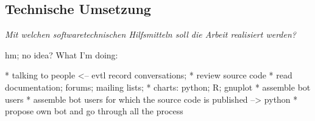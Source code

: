 \documentclass[pdftex,a4paper,11pt]{scrartcl}
\begin{document}
\begin{comment}
\begin{itemize}
	\item Eine wesentliche Grundlage der wissenschaftlichen Arbeit, ist die systematische Anwendung einer Forschungsmethode. Die erlaubt Ihnen ein systematisches Vorgehen bei Ihrer Masterarbeit.
	\item Am HCC.lab werden Arbeiten in den folgenden Bereichen geschrieben:
	       \begin{itemize}
				\item Information Retrieval
				\item Recommender Systeme
				\item Data/Community Analytics <--- me?
				\item Information Visualization
				\item Interaction Design
			\end{itemize}
	\item Sie sollten in der Lage sein, Ihre Arbeit in einen dieser Bereiche einzuordnen. Falls Sie Probleme dabei haben, wenden Sie sich bitte an Ihre/n Betreuer/in.
	\item Für die Auswahl der geeigneten Forschungsmethode verweise ich Sie auf zwei Bücher hin, die eine Zusammenstellung der verfügbaren Methoden und ihre praktischen Anwendung im Bereich Human-Computer Interaction diskutieren \cite{olson2014ways}, \cite{lazar2010research}. Beide Bücher sind bei Frau Prof. Müller-Birn verfügbar. Einzelne Artikel könnten Ihnen auch in einer elektronischen Version zur Verfügung gestellt werden.
\end{itemize}
\end{comment}

\subsection{Technische Umsetzung}
\noindent \emph{Mit welchen softwaretechnischen Hilfsmitteln soll die Arbeit realisiert werden?}
\begin{comment}
\begin{itemize}
	\item Selbstverständlich können Sie an der Stelle noch nicht alles wissen, aber Sie sollen sich hier bereits einen guten Überblick verschaffen.
\end{itemize}
\end{comment}

hm; no idea?
What I'm doing:

* talking to people <-- evtl record conversations;
* review source code
* read documentation; forums; mailing lists;
* charts: python; R; gnuplot
* assemble bot users
* assemble bot users for which the source code is published
--> python
* propose own bot and go through all the process
\end{document}
